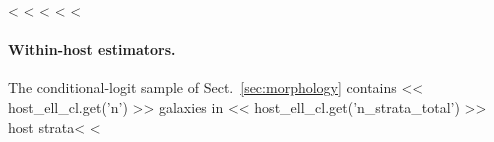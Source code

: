 \documentclass{aa}
\newcommand{\CC}{Control\textsubscript{4C}}
\newcommand{\CG}{CG\textsubscript{4}}
\begin{document}
\begin{appendix}
<%
<%
<%
<%
<%
\paragraph{Within-host estimators.} The conditional-logit sample of Sect.~\ref{sec:morphology} contains << host_ell_cl.get('n') >> galaxies in << host_ell_cl.get('n_strata_total') >> host strata<%
<%


\end{appendix}
\end{document}
